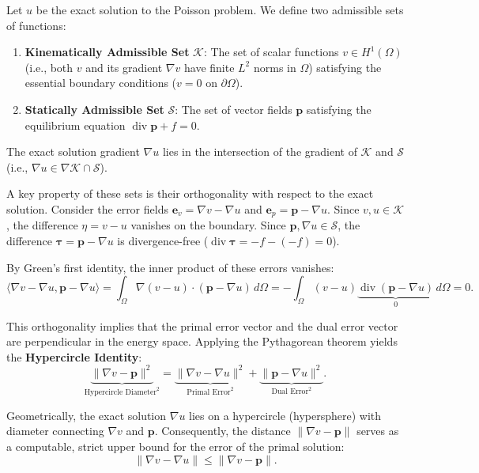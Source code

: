 \documentclass[12pt, a4paper]{article}
\DeclareMathOperator{\divg}{div}
\begin{document}
Let $u$ be the exact solution to the Poisson problem. We define two admissible sets of functions:
\begin{enumerate}
    \item \textbf{Kinematically Admissible Set} $\mathcal{K}$: The set of scalar functions $v \in H^1(\Omega)$ (i.e., both $v$ and its gradient $\nabla v$ have finite $L^2$ norms in $\Omega$) satisfying the essential boundary conditions ($v = 0$ on $\partial \Omega$).
    \item \textbf{Statically Admissible Set} $\mathcal{S}$: The set of vector fields $\mathbf{p}$ satisfying the equilibrium equation $\divg \mathbf{p} + f = 0$.
\end{enumerate}

The exact solution gradient $\nabla u$ lies in the intersection of the gradient of $\mathcal{K}$ and $\mathcal{S}$ (i.e., $\nabla u \in \nabla \mathcal{K} \cap \mathcal{S}$).

A key property of these sets is their orthogonality with respect to the exact solution. Consider the error fields $\mathbf{e}_v = \nabla v - \nabla u$ and $\mathbf{e}_p = \mathbf{p} - \nabla u$. Since $v, u \in \mathcal{K}$, the difference $\eta = v - u$ vanishes on the boundary. Since $\mathbf{p}, \nabla u \in \mathcal{S}$, the difference $\boldsymbol{\tau} = \mathbf{p} - \nabla u$ is divergence-free ($\divg \boldsymbol{\tau} = -f - (-f) = 0$).

By Green's first identity, the inner product of these errors vanishes:
\begin{equation}
    \langle \nabla v - \nabla u, \mathbf{p} - \nabla u \rangle = \int_{\Omega} \nabla (v-u) \cdot (\mathbf{p} - \nabla u) \, d\Omega = - \int_{\Omega} (v-u) \underbrace{\divg (\mathbf{p} - \nabla u)}_{0} \, d\Omega = 0.
\end{equation}

This orthogonality implies that the primal error vector and the dual error vector are perpendicular in the energy space. Applying the Pythagorean theorem yields the \textbf{Hypercircle Identity}:
\begin{equation} \label{eq:hypercircle_main}
    \underbrace{\| \nabla v - \mathbf{p} \|^2}_{\text{Hypercircle Diameter}^2} = \underbrace{\| \nabla v - \nabla u \|^2}_{\text{Primal Error}^2} + \underbrace{\| \mathbf{p} - \nabla u \|^2}_{\text{Dual Error}^2}.
\end{equation}

Geometrically, the exact solution $\nabla u$ lies on a hypercircle (hypersphere) with diameter connecting $\nabla v$ and $\mathbf{p}$. Consequently, the distance $\| \nabla v - \mathbf{p} \|$ serves as a computable, strict upper bound for the error of the primal solution:
\begin{equation}
    \| \nabla v - \nabla u \| \le \| \nabla v - \mathbf{p} \|.
\end{equation}
\end{document}
